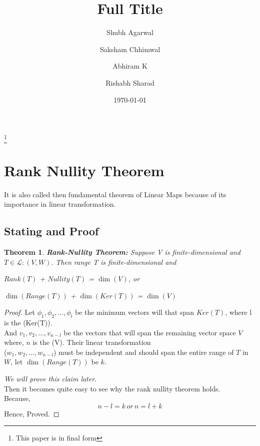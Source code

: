 \documentclass[a4paper,12pt,reqno,oneside]{amsart}
\newtheorem{theorem}{Theorem}
\theoremstyle{plain}
\numberwithin{equation}{section}
\begin{document}
\title[Short Title (for the running head)]{Full Title}

\author{Shubh Agarwal}

 \author{Saksham Chhimwal}

 \author{Abhiram K}

\author{Rishabh Sharad}
%

\thanks{This paper is in final form}
\date{\today}
\maketitle

\section{Rank Nullity Theorem}
It is also called then fundamental theorem of Linear Maps because of its importance
in linear transformation.

\subsection{Stating and Proof}

\begin{theorem}
	\textbf{Rank-Nullity Theorem:}
	Suppose V is finite-dimensional and $T\in\mathcal{L}:(V, W).$ Then range T is 
	finite-dimensional and 
	\begin{center}
		$Rank(T)$ + $Nullity(T)$ = $\dim(V)$, or
	\end{center}
	\begin{center}
		$\dim(Range(T))$ + $\dim(Ker(T))$ = $\dim(V)$
	\end{center}
\end{theorem}

\begin{proof}[Proof]
	
	Let $\phi_1,\phi_2,\ldots,\phi_l$ be the minimum vectors will that span $Ker(T)$, where l is the \dim(Ker(T)).\\
	And $v_1, v_2, \ldots, v_{n-l}$ be the vectors that will span the remaining vector space $V$ where, $n$ is the \dim(V).%
	Their linear transformation \\($w_1, w_2, \ldots, w_{n-l} $) must be independent and should span the entire range of
	$T$ in $W$, let $\dim(Range(T))$ be $k$.
	
	\emph{We will prove this claim later}.\\
	Then it becomes quite easy to see why the rank nullity theorem holds.\\
	Because,
	$$
		n-l=k \,or\, n=l+k
	$$
	Hence, Proved.
\end{proof}
\end{document}

